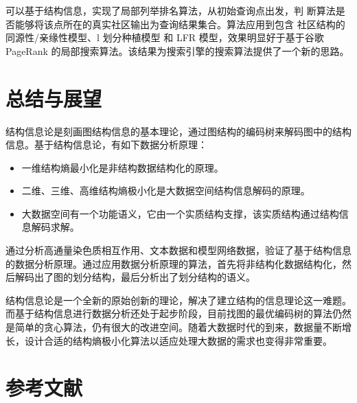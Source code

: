 \documentclass[a4paper]{apa6}
\begin{document}
可以基于结构信息，实现了局部列举排名算法，从初始查询点出发，判 断算法是否能够将该点所在的真实社区输出为查询结果集合。算法应用到包含 社区结构的同源性/亲缘性模型、l 划分种植模型 和 LFR 模型，效果明显好于基于谷歌 PageRank 的局部搜索算法。该结果为搜索引擎的搜索算法提供了一个新的思路。

\section{总结与展望}
结构信息论是刻画图结构信息的基本理论，通过图结构的编码树来解码图中的结构信息。基于结构信息论，有如下数据分析原理：
\begin{itemize}
    \item 一维结构熵最小化是非结构数据结构化的原理。
    \item 二维、三维、高维结构熵极小化是大数据空间结构信息解码的原理。
    \item 大数据空间有一个功能语义，它由一个实质结构支撑，该实质结构通过结构信息解码求解。
\end{itemize}

通过分析高通量染色质相互作用、文本数据和模型网络数据，验证了基于结构信息的数据分析原理。通过应用数据分析原理的算法，首先将非结构化数据结构化，然后解码出了图的划分结构，最后分析出了划分结构的语义。

结构信息论是一个全新的原始创新的理论，解决了建立结构的信息理论这一难题。而基于结构信息进行数据分析还处于起步阶段，目前找图的最优编码树的算法仍然是简单的贪心算法，仍有很大的改进空间。随着大数据时代的到来，数据量不断增长，设计合适的结构熵极小化算法以适应处理大数据的需求也变得非常重要。

\section{参考文献}
\label{sec:org9101910}


\end{document}
